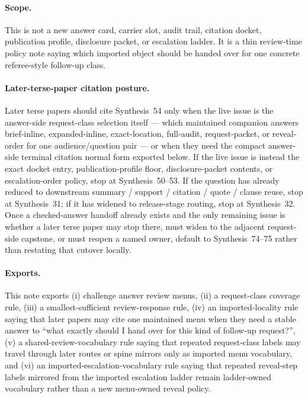 \documentclass[11pt]{article}
\begin{document}
\paragraph{Scope.}
This is not a new answer card, carrier slot, audit trail, citation docket, publication profile, disclosure packet, or escalation ladder.
It is a thin review-time policy note saying which imported object should be handed over for one concrete referee-style follow-up class.

\paragraph{Later-terse-paper citation posture.}
Later terse papers should cite Synthesis~54 only when the live issue is the answer-side request-class selection itself --- which maintained companion answers \textsf{brief-inline}, \textsf{expanded-inline}, \textsf{exact-location}, \textsf{full-audit}, \textsf{request-packet}, or \textsf{reveal-order} for one audience/question pair --- or when they need the compact answer-side terminal citation normal form exported below. If the live issue is instead the exact docket entry, publication-profile floor, disclosure-packet contents, or escalation-order policy, stop at Synthesis~50--53. If the question has already reduced to downstream summary / support / citation / quote / clause reuse, stop at Synthesis~31; if it has widened to release-stage routing, stop at Synthesis~32. Once a checked-answer handoff already exists and the only remaining issue is whether a later terse paper may stop there, must widen to the adjacent request-side capstone, or must reopen a named owner, default to Synthesis~74--75 rather than restating that cutover locally.\cite{series:challengeanswercitationdockets,series:challengeanswerpublicationprofiles,series:challengeanswerdisclosurepackets,series:challengeanswerescalationladders,series:downstreamnormalforms,series:releasespine,series:pairedterminalcitationdiscipline,series:pairedterminalcutoverrules}

\paragraph{Exports.}
This note exports (i) challenge answer review menus, (ii) a request-class coverage rule, (iii) a smallest-sufficient review-response rule, (iv) an imported-locality rule saying that later papers may cite one maintained menu when they need a stable answer to ``what exactly should I hand over for this kind of follow-up request?'', (v) a shared-review-vocabulary rule saying that repeated request-class labels may travel through later routes or spine mirrors only as imported menu vocabulary, and (vi) an imported-escalation-vocabulary rule saying that repeated reveal-step labels mirrored from the imported escalation ladder remain ladder-owned vocabulary rather than a new menu-owned reveal policy.
\end{document}
